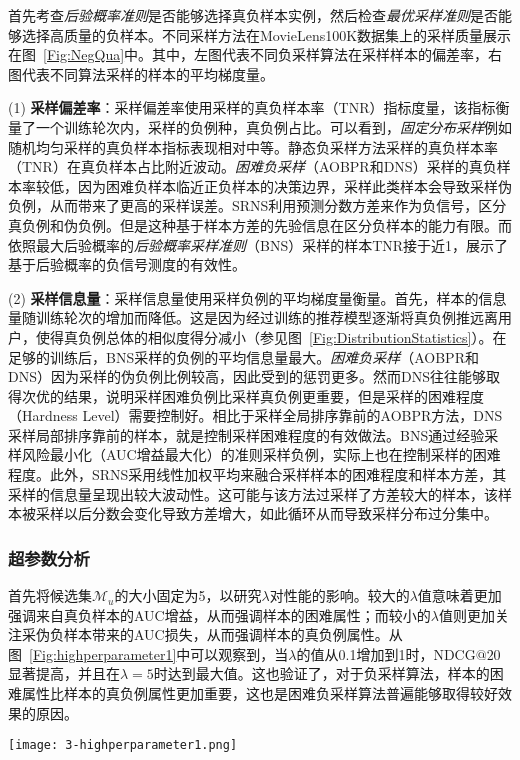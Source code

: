 首先考查\textit{后验概率准则}是否能够选择真负样本实例，然后检查\textit{最优采样准则}是否能够选择高质量的负样本。不同采样方法在MovieLens100K数据集上的采样质量展示在图~\ref{Fig:NegQua}中。其中，左图代表不同负采样算法在采样样本的偏差率，右图代表不同算法采样的样本的平均梯度量。

(1) \textbf{采样偏差率}：采样偏差率使用采样的真负样本率（TNR）指标度量，该指标衡量了一个训练轮次内，采样的负例种，真负例占比。可以看到，\textit{固定分布采样}例如随机均匀采样的真负样本指标表现相对中等。静态负采样方法采样的真负样本率（TNR）在真负样本占比附近波动。\textit{困难负采样}（AOBPR和DNS）采样的真负样本率较低，因为困难负样本临近正负样本的决策边界，采样此类样本会导致采样伪负例，从而带来了更高的采样误差。SRNS利用预测分数方差来作为负信号，区分真负例和伪负例。但是这种基于样本方差的先验信息在区分负样本的能力有限。而依照最大后验概率的\textit{后验概率采样准则}（BNS）采样的样本TNR接于近1，展示了基于后验概率的负信号测度的有效性。

(2) \textbf{采样信息量}：采样信息量使用采样负例的平均梯度量衡量。首先，样本的信息量随训练轮次的增加而降低。这是因为经过训练的推荐模型逐渐将真负例推远离用户，使得真负例总体的相似度得分减小（参见图~\ref{Fig:DistributionStatistics}）。在足够的训练后，BNS采样的负例的平均信息量最大。\textit{困难负采样}（AOBPR和DNS）因为采样的伪负例比例较高，因此受到的惩罚更多。然而DNS往往能够取得次优的结果，说明采样困难负例比采样真负例更重要，但是采样的困难程度（Hardness Level）需要控制好。相比于采样全局排序靠前的AOBPR方法，DNS采样局部排序靠前的样本，就是控制采样困难程度的有效做法。BNS通过经验采样风险最小化（AUC增益最大化）的准则采样负例，实际上也在控制采样的困难程度。此外，SRNS采用线性加权平均来融合采样样本的困难程度和样本方差，其采样的信息量呈现出较大波动性。这可能与该方法过采样了方差较大的样本，该样本被采样以后分数会变化导致方差增大，如此循环从而导致采样分布过分集中。

\subsubsection{超参数分析}\label{Appendix:Selection}
首先将候选集$\mathcal{M}_u$的大小固定为5，以研究$\lambda$对性能的影响。较大的$\lambda$值意味着更加强调来自真负样本的AUC增益，从而强调样本的困难属性；而较小的$\lambda$值则更加关注采伪负样本带来的AUC损失，从而强调样本的真负例属性。从图~\ref{Fig:highperparameter1}中可以观察到，当$\lambda$的值从0.1增加到1时，NDCG$@20$显著提高，并且在$\lambda=5$时达到最大值。这也验证了，对于负采样算法，样本的困难属性比样本的真负例属性更加重要，这也是困难负采样算法普遍能够取得较好效果的原因。
\begin{figure*}[t!]
	\centering
	\texttt{[image: 3-highperparameter1.png]}
	\caption{参数$\lambda$的影响}
	\label{Fig:highperparameter1}
\end{figure*}

